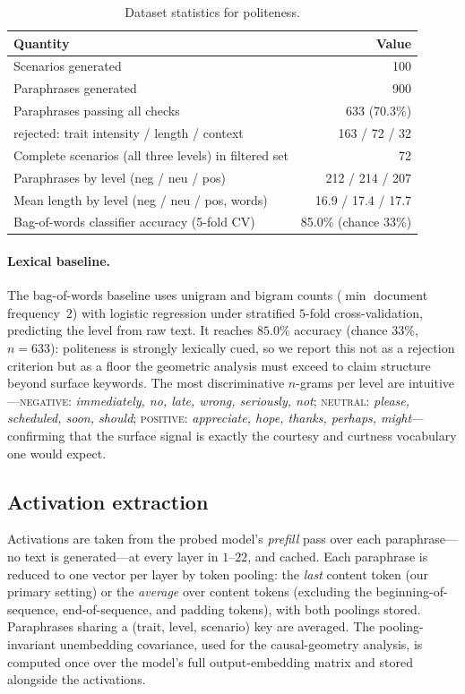 \documentclass{article}
\begin{document}
\begin{table}[h]
\centering
\small
\begin{tabular}{lr}
\toprule
Quantity & Value \\
\midrule
Scenarios generated & 100 \\
Paraphrases generated & 900 \\
Paraphrases passing all checks & 633 (70.3\%) \\
\quad rejected: trait intensity / length / context & 163 / 72 / 32 \\
Complete scenarios (all three levels) in filtered set & 72 \\
Paraphrases by level (neg / neu / pos) & 212 / 214 / 207 \\
Mean length by level (neg / neu / pos, words) & 16.9 / 17.4 / 17.7 \\
Bag-of-words classifier accuracy (5-fold CV) & 85.0\% (chance 33\%) \\
\bottomrule
\end{tabular}
\caption{Dataset statistics for politeness.}
\label{tab:dataset-stats}
\end{table}

\paragraph{Lexical baseline.}
The bag-of-words baseline uses unigram and bigram counts ($\min$ document
frequency~$2$) with logistic regression under stratified $5$-fold
cross-validation, predicting the level from raw text. It reaches $85.0\%$ accuracy
(chance $33\%$, $n=633$): politeness is strongly lexically cued, so we report this
not as a rejection criterion but as a floor the geometric analysis must exceed to
claim structure beyond surface keywords. The most discriminative $n$-grams per
level are intuitive---\textsc{negative}: \emph{immediately, no, late, wrong,
seriously, not}; \textsc{neutral}: \emph{please, scheduled, soon, should};
\textsc{positive}: \emph{appreciate, hope, thanks, perhaps, might}---confirming
that the surface signal is exactly the courtesy and curtness vocabulary one would
expect.

\subsection{Activation extraction}

Activations are taken from the probed model's \emph{prefill} pass over each
paraphrase---no text is generated---at every layer in $1$--$22$, and cached. Each
paraphrase is reduced to one vector per layer by token pooling: the \emph{last}
content token (our primary setting) or the \emph{average} over content tokens
(excluding the beginning-of-sequence, end-of-sequence, and padding tokens), with
both poolings stored. Paraphrases sharing a (trait, level, scenario) key are
averaged. The pooling-invariant unembedding covariance, used for the
causal-geometry analysis, is computed once over the model's full output-embedding
matrix and stored alongside the activations.
\end{document}
